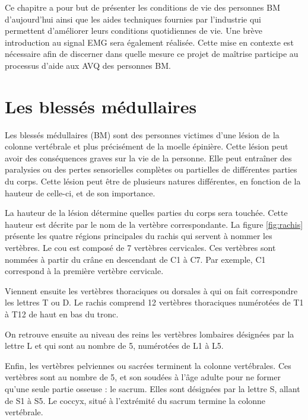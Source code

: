 \documentclass[letterpaper, twoside, 12pt, memoire, creativecommons, hyperref]{thETS}
\begin{document}
Ce chapitre a pour but de présenter les conditions de vie des personnes BM d'aujourd'hui ainsi que les aides techniques fournies par l'industrie qui permettent d'améliorer leurs conditions quotidiennes de vie. Une brève introduction au signal EMG sera également réalisée. Cette mise en contexte est nécessaire afin de discerner dans quelle mesure ce projet de maîtrise participe au processus d'aide aux AVQ des personnes BM.


\section{Les blessés médullaires}

Les blessés médullaires (BM) sont des personnes victimes d'une lésion de la colonne vertébrale et plus précisément de la moelle épinière. Cette lésion peut avoir des conséquences graves sur la vie de la personne. Elle peut entraîner des paralysies ou des pertes sensorielles complètes ou partielles de différentes parties du corps. Cette lésion peut être de plusieurs natures différentes, en fonction de la hauteur de celle-ci, et de son importance. 

La hauteur de la lésion détermine quelles parties du corps sera touchée. Cette hauteur est décrite par le nom de la vertèbre correspondante. La figure \ref{fig:rachis} présente les quatre régions principales du rachis qui servent à nommer les vertèbres. Le cou est composé de 7 vertèbres cervicales. Ces vertèbres sont nommées à partir du crâne en descendant de C1 à C7. Par exemple, C1 correspond à la première vertèbre cervicale. 

Viennent ensuite les vertèbres thoraciques ou dorsales à qui on fait correspondre les lettres T ou D. Le rachis comprend 12 vertèbres thoraciques numérotées de T1 à T12 de haut en bas du tronc. 

On retrouve ensuite au niveau des reins les vertèbres lombaires désignées par la lettre L et qui sont au nombre de 5, numérotées de L1 à L5. 

Enfin, les vertèbres pelviennes ou sacrées terminent la colonne vertébrales. Ces vertèbres sont au nombre de 5, et son soudées à l'âge adulte pour ne former qu'une seule partie osseuse : le sacrum. Elles sont désignées par la lettre S, allant de S1 à S5. Le coccyx, situé à l'extrémité du sacrum termine la colonne vertébrale.
\end{document}

